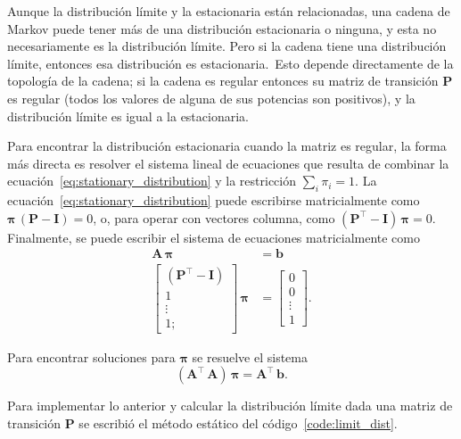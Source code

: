 Aunque la distribución límite y la estacionaria están relacionadas, una cadena de Markov puede tener más de una distribución estacionaria o ninguna, y esta no necesariamente es la distribución límite.
Pero si la cadena tiene una distribución límite, entonces esa distribución es estacionaria.\ Esto depende directamente de la topología de la cadena;
si la cadena es regular entonces su matriz de transición $\mathbf{P}$ es regular (todos los valores de alguna de sus potencias son positivos), y la distribución límite es igual a la estacionaria.

Para encontrar la distribución estacionaria cuando la matriz es regular, la forma más directa es resolver el sistema lineal de ecuaciones que resulta de combinar la ecuación~\eqref{eq:stationary_distribution} y la restricción $\sum_i \pi_i = 1$.
La ecuación~\eqref{eq:stationary_distribution} puede escribirse matricialmente como $\boldsymbol{\pi}\,(\mathbf{P} - \mathbf{I}) = 0$, o, para operar con vectores columna, como $\left(\mathbf{P}^\intercal - \mathbf{I}\right)\,\boldsymbol{\pi} = 0$.
Finalmente, se puede escribir el sistema de ecuaciones matricialmente como
%
\begin{align}
    \mathbf{A}\,\boldsymbol{\pi} &= \mathbf{b} \\
    \left[\begin{matrix}
              \left(\mathbf{P}^\intercal - \mathbf{I}\right) \\ 1 \\ \vdots \\ 1;
    \end{matrix}\right]\,\boldsymbol{\pi} &= \left[\begin{matrix}
                                                       0 \\ 0 \\ \vdots \\ 1
    \end{matrix}\right].
\end{align}

Para encontrar soluciones para $\boldsymbol{\pi}$ se resuelve el sistema
\begin{equation}
    \left(\mathbf{A}^\intercal\,\mathbf{A}\right)\,\boldsymbol{\pi} = \mathbf{A}^\intercal\,\mathbf{b}.
\end{equation}

Para implementar lo anterior y calcular la distribución límite dada una matriz de transición $\mathbf{P}$ se escribió el método estático del código~\ref{code:limit_dist}.

